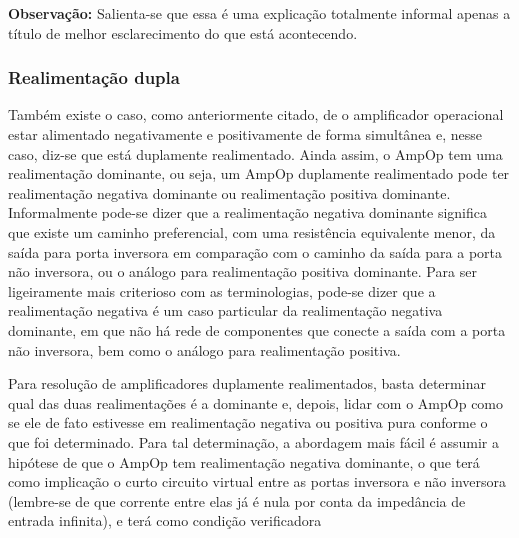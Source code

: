 \documentclass{article}
\numberwithin{equation}{section}
\begin{document}
\textbf{Observação: }Salienta-se que essa é uma explicação totalmente informal apenas a título de melhor esclarecimento do que está acontecendo.

\subsubsection{Realimentação dupla}
\label{subsubsec:ganho finito}

Também existe o caso, como anteriormente citado, de o amplificador operacional estar alimentado negativamente e positivamente de forma simultânea e, nesse caso, diz-se que está duplamente realimentado. Ainda assim, o AmpOp tem uma realimentação dominante, ou seja, um AmpOp duplamente realimentado pode ter realimentação negativa dominante ou realimentação positiva dominante. Informalmente pode-se dizer que a realimentação negativa dominante significa que existe um caminho preferencial, com uma resistência equivalente menor, da saída para porta inversora em comparação com o caminho da saída para a porta não inversora, ou o análogo para realimentação positiva dominante. Para ser ligeiramente mais criterioso com as terminologias, pode-se dizer que a realimentação negativa é um caso particular da realimentação negativa dominante, em que não há rede de componentes que conecte a saída com a porta não inversora, bem como o análogo para realimentação positiva.

\begin{center}
\end{center}

Para resolução de amplificadores duplamente realimentados, basta determinar qual das duas realimentações é a dominante e, depois, lidar com o AmpOp como se ele de fato estivesse em realimentação negativa ou positiva pura conforme o que foi determinado. Para tal determinação, a abordagem mais fácil é assumir a hipótese de que o AmpOp tem realimentação negativa dominante, o que terá como implicação o curto circuito virtual entre as portas inversora e não inversora (lembre-se de que corrente entre elas já é nula por conta da impedância de entrada infinita), e terá como condição verificadora
\end{document}
